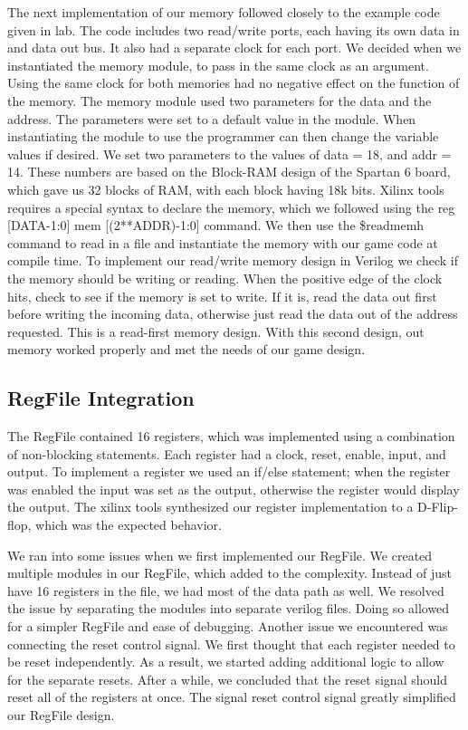 \documentclass[11pt]{article}
\begin{document}
The next implementation of our memory followed closely to the example code given in lab. The code includes two read/write ports, each having its own data in and data out bus. It also had a separate clock for each port. We decided when we instantiated the memory module, to pass in the same clock as an argument. Using the same clock for both memories had no negative effect on the function of the memory. The memory module used two parameters for the data and the address. The parameters were set to a default value in the module. When instantiating the module to use the programmer can then change the variable values if desired. We set two parameters to the values of data = 18, and addr = 14. These numbers are based on the Block-RAM design of the Spartan 6 board, which gave us 32 blocks of RAM, with each block having 18k bits. Xilinx tools requires a special syntax to declare the memory, which we followed using the reg [DATA-1:0] mem [(2**ADDR)-1:0] command. We then use the \$readmemh command to read in a file and instantiate the memory with our game code at compile time. To implement our read/write memory design in Verilog we check if the memory should be writing or reading. When the positive edge of the clock hits, check to see if the memory is set to write. If it is, read the data out first before writing the incoming data, otherwise just read the data out of the address requested. This is a read-first memory design. With this second design, out memory worked properly and met the needs of our game design.

\subsection{RegFile Integration}
    The RegFile contained 16 registers, which was implemented using a combination of non-blocking statements. Each register had a clock, reset, enable, input, and output. To implement a register we used an if/else statement; when the register was enabled the input was set as the output, otherwise the register would display the output. The xilinx tools synthesized our register implementation to a D-Flip-flop, which was the expected behavior. 

    We ran into some issues when we first implemented our RegFile. We created multiple modules in our RegFile, which added to the complexity. Instead of just have 16 registers in the file, we had most of the data path as well. We resolved the issue by separating the modules into separate verilog files. Doing so allowed for a simpler RegFile and ease of debugging. Another issue we encountered was connecting the reset control signal. We first thought that each register needed to be reset independently. As a result, we started adding additional logic to allow for the separate resets. After a while, we concluded that the reset signal should reset all of the registers at once. The signal reset control signal greatly simplified our RegFile design. 
\end{document}

